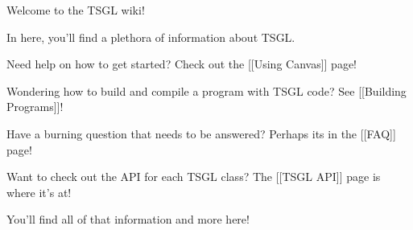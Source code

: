 Welcome to the T\-S\-G\-L wiki!

In here, you'll find a plethora of information about T\-S\-G\-L.

Need help on how to get started? Check out the \mbox{[}\mbox{[}Using Canvas\mbox{]}\mbox{]} page!

Wondering how to build and compile a program with T\-S\-G\-L code? See \mbox{[}\mbox{[}Building Programs\mbox{]}\mbox{]}!

Have a burning question that needs to be answered? Perhaps its in the \mbox{[}\mbox{[}F\-A\-Q\mbox{]}\mbox{]} page!

Want to check out the A\-P\-I for each T\-S\-G\-L class? The \mbox{[}\mbox{[}T\-S\-G\-L A\-P\-I\mbox{]}\mbox{]} page is where it’s at!

You'll find all of that information and more here! 